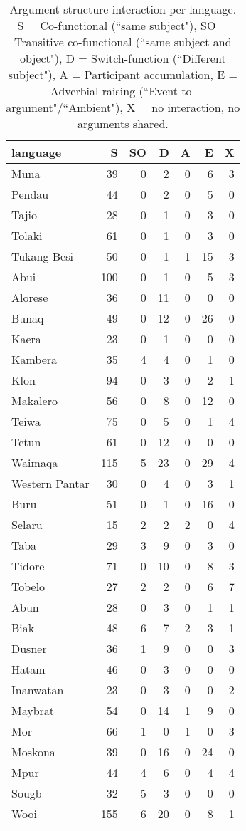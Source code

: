 \begin{table}


\begin{tabular}{lrrrrrr}
  \hline\hline
language & S & SO & D & A & E & X \tabularnewline
  \hline
  Muna &  39 &   0 &   2 &   0 &   6 &   3 \tabularnewline 
  Pendau &  44 &   0 &   2 &   0 &   5 &   0 \tabularnewline 
  Tajio &  28 &   0 &   1 &   0 &   3 &   0 \tabularnewline 
  Tolaki &  61 &   0 &   1 &   0 &   3 &   0 \tabularnewline 
  Tukang Besi &  50 &   0 &   1 &   1 &  15 &   3 \tabularnewline 
  \hline
  Abui & 100 &   0 &   1 &   0 &   5 &   3 \tabularnewline 
  Alorese &  36 &   0 &  11 &   0 &   0 &   0 \tabularnewline 
  Bunaq &  49 &   0 &  12 &   0 &  26 &   0 \tabularnewline 
  Kaera &  23 &   0 &   1 &   0 &   0 &   0 \tabularnewline 
  Kambera &  35 &   4 &   4 &   0 &   1 &   0 \tabularnewline 
  Klon &  94 &   0 &   3 &   0 &   2 &   1 \tabularnewline 
  Makalero &  56 &   0 &  8 &   0 &  12 &   0 \tabularnewline 
  Teiwa &  75 &   0 &   5 &   0 &   1 &   4 \tabularnewline 
  Tetun &  61 &   0 &  12 &   0 &   0 &   0 \tabularnewline 
  Waimaqa & 115 &   5 &  23 &   0 &  29 &   4 \tabularnewline 
  Western Pantar &  30 &   0 &   4 &   0 &   3 &   1 \tabularnewline 
  \hline
  Buru & 51 & 0 & 1 & 0 & 16 & 0 \tabularnewline
  Selaru &  15 &   2 &   2 &   2 &   0 &   4 \tabularnewline 
  Taba &  29 &   3 &  9 &   0 &   3 &   0 \tabularnewline 
  Tidore & 71 & 0 & 10 & 0 & 8 & 3 \tabularnewline
  Tobelo &  27 &   2 &   2 &   0 &   6 &  7 \tabularnewline 
  \hline
  Abun &  28 &   0 &   3 &   0 &   1 &   1 \tabularnewline 
  Biak &  48 &   6 &  7 &   2 &   3 &   1 \tabularnewline 
  Dusner &  36 &   1 &  9 &   0 &   0 &   3 \tabularnewline 
  Hatam &  46 &   0 &  3 &   0 &   0 &   0 \tabularnewline 
  Inanwatan &  23 &   0 &   3 &   0 &   0 &   2 \tabularnewline 
  Maybrat &  54 &   0 &  14 &   1 &  9 &   0 \tabularnewline 
  Mor &  66 &   1 &   0 &   1 &   0 &  3 \tabularnewline 
  Moskona &  39 &   0 &  16 &   0 &  24 &   0 \tabularnewline 
  Mpur &  44 &   4 &   6 &   0 &   4 &   4 \tabularnewline 
  Sougb &  32 &   5 &   3 &   0 &   0 &   0 \tabularnewline 
  Wooi & 155 &   6 &  20 &   0 &   8 &   1 \tabularnewline 
   \hline
\end{tabular}
\caption[Argument structure interaction per language]{Argument structure interaction per language. S = Co-functional (``same subject"), SO = Transitive co-functional (``same subject and object"), D = Switch-function (``Different subject"), A = Participant accumulation, E = Adverbial raising (``Event-to-argument"/``Ambient"), X = no interaction, no arguments shared.}
\label{table:Referentiality_per_lang}


\end{table}


